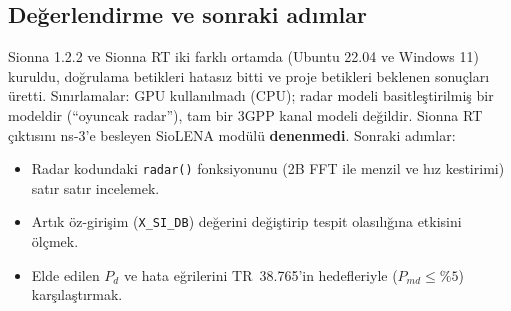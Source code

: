 \subsection*{Değerlendirme ve sonraki adımlar}
Sionna 1.2.2 ve Sionna RT iki farklı ortamda (Ubuntu 22.04 ve Windows 11) kuruldu, doğrulama betikleri hatasız bitti ve proje betikleri beklenen sonuçları üretti. Sınırlamalar: GPU kullanılmadı (CPU); radar modeli basitleştirilmiş bir modeldir (``oyuncak radar''), tam bir 3GPP kanal modeli değildir. Sionna RT çıktısını ns-3'e besleyen SioLENA modülü \textbf{denenmedi}. Sonraki adımlar:
\begin{itemize}
\item Radar kodundaki \texttt{radar()} fonksiyonunu (2B FFT ile menzil ve hız kestirimi) satır satır incelemek.
\item Artık öz-girişim (\texttt{X\_SI\_DB}) değerini değiştirip tespit olasılığına etkisini ölçmek.
\item Elde edilen $P_d$ ve hata eğrilerini TR~38.765'in hedefleriyle ($P_{md}\le\%5$) karşılaştırmak.
\end{itemize}

